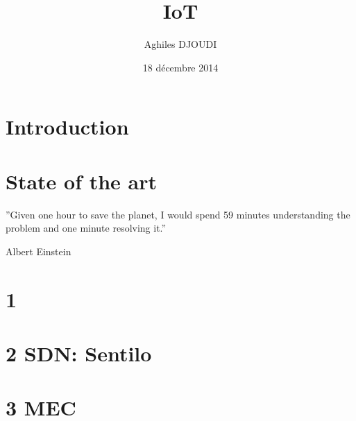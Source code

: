 \documentclass[a4paper, 12pt, twoside,openright]{report}
\title{IoT}
\author{Aghiles DJOUDI}
\date{18 décembre 2014}
\begin{document}
\preface
	
	
	
	
	
	
\body

\chapter{Introduction}
\minitoc
	

\chapter{State of the art \cite{bregell_hardware_2015}}
\epigraph{''Given one hour to save the planet, I would spend 59 minutes understanding the problem and one minute resolving it.''}{Albert Einstein}

\minitoc
	
	
 	
 	
 	
 	

\chapter{1 \cite{bregell_hardware_2015}}

\minitoc
	
	
	
	
	
	
	

\chapter{2 SDN: Sentilo \cite{_contiki_2016a}}
\minitoc
	
	
	
	
	
	
	

\chapter{3 MEC}
\minitoc
	
	
	
	
	
	
	
\end{document}

